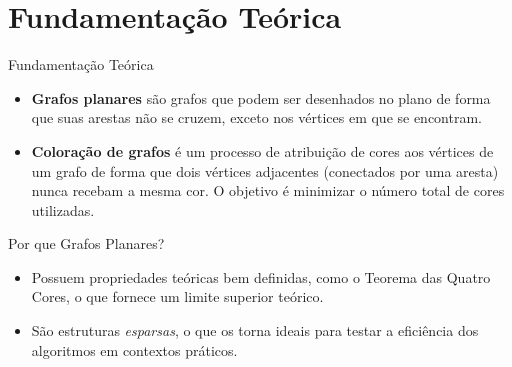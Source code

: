 \section{Fundamentação Teórica}

\begin{frame}{Fundamentação Teórica}
    \begin{itemize}
        \item \textbf{Grafos planares} são grafos que podem ser desenhados no plano de forma que suas arestas não se cruzem, exceto nos vértices em que se encontram.
        
        \item \textbf{Coloração de grafos} é um processo de atribuição de cores aos vértices de um grafo de forma que dois vértices adjacentes (conectados por uma aresta) nunca recebam a mesma cor. O objetivo é minimizar o número total de cores utilizadas.
    \end{itemize}
\end{frame}

\begin{frame}{Por que Grafos Planares?}
    \begin{itemize}
        \item Possuem propriedades teóricas bem definidas, como o Teorema das Quatro Cores, o que fornece um limite superior teórico.
        
        \item São estruturas \textit{esparsas}, o que os torna ideais para testar a eficiência dos algoritmos em contextos práticos.
    \end{itemize}
\end{frame}


